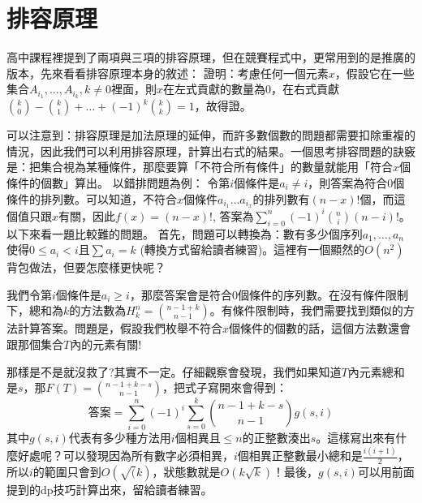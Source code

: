 \section{排容原理}
高中課程裡提到了兩項與三項的排容原理，但在競賽程式中，更常用到的是推廣的版本，先來看看排容原理本身的敘述：
證明：考慮任何一個元素$x$，假設它在一些集合$A_{i_1}, \dots, A_{i_k}, k \neq 0$裡面，則$x$在左式貢獻的數量為$0$，在右式貢獻$\binom{k}{0} - \binom{k}{1} + \dots + (-1)^{k}\binom{k}{k} = 1$，故得證。
\\
\par 可以注意到：排容原理是加法原理的延伸，而許多數個數的問題都需要扣除重複的情況，因此我們可以利用排容原理，計算出右式的結果。一個思考排容問題的訣竅是：把集合視為某種條件，那麼要算「不符合所有條件」的數量就能用「符合$x$個條件的個數」算出。
以錯排問題為例：
令第$i$個條件是$a_i \neq i$，則答案為符合$0$個條件的排列數。可以知道，不符合$x$個條件$a_{i_1} \dots a_{i_x}$的排列數有$(n-x)!$個，而這個值只跟$x$有關，因此$f(x) = (n-x)!$, 答案為$\sum_{i=0}^n (-1)^i \binom{n}{i}(n-i)!$。\\

以下來看一題比較難的問題。
首先，問題可以轉換為：數有多少個序列$a_1, \dots, a_n$使得$0 \leq a_i < i$且$\sum a_i = k$ (轉換方式留給讀者練習)。這裡有一個顯然的$O(n^2)$背包做法，但要怎麼樣更快呢？
\par 我們令第$i$個條件是$a_i \geq i$，那麼答案會是符合$0$個條件的序列數。在沒有條件限制下，總和為$k$的方法數為$H_k^n = \binom{n-1+k}{n-1}$。有條件限制時，我們需要找到類似的方法計算答案。問題是，假設我們枚舉不符合$x$個條件的個數的話，這個方法數還會跟那個集合$T$內的元素有關!
\par 那樣是不是就沒救了?其實不一定。仔細觀察會發現，我們如果知道$T$內元素總和是$s$，那$F(T) = \binom{n-1+k-s}{n-1}$，把式子寫開來會得到：
\[\textbf{答案} = \sum_{i=0}^n (-1)^{i} \sum_{s=0}^k\binom{n-1+k-s}{n-1} g(s, i) \]
其中$g(s, i)$代表有多少種方法用$i$個相異且$\leq n$的正整數湊出$s$。這樣寫出來有什麼好處呢？可以發現因為所有數字必須相異，$i$個相異正整數最小總和是$\frac{i(i+1)}{2}$，所以$i$的範圍只會到$O(\sqrt(k)$，狀態數就是$O(k\sqrt k)$！最後，$g(s, i)$可以用前面提到的dp技巧計算出來，留給讀者練習。





